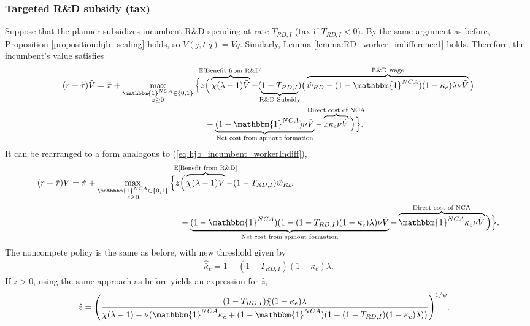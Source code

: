 \documentclass[11pt,english]{article}
\theoremstyle{definition}
\begin{document}
\subsubsection{Targeted R\&D subsidy (tax)}\label{appendix:model:efficiencyderivations:OIRDtax}

Suppose that the planner subsidizes incumbent R\&D spending at rate $T_{RD,I}$ (tax if $T_{RD,I} < 0$). By the same argument as before, Proposition \ref{proposition:hjb_scaling} holds, so $V(j,t|q) = \tilde{V}q$. Similarly, Lemma \ref{lemma:RD_worker_indifference1} holds. Therefore, the incumbent's value satisfies
\begin{align}
	(r + \hat{\tau}) \tilde{V} = \tilde{\pi} + \max_{\substack{\mathbbm{1}^{NCA} \in \{0,1\} \\ z \ge 0}} \Big\{z &\Big( \overbrace{\chi (\lambda - 1) \tilde{V}}^{\mathclap{\mathbb{E}[\textrm{Benefit from R\&D}]}}- (\underbrace{1-T_{RD,I}}_{\mathclap{\text{R\&D Subsidy}}}) \big( \overbrace{\hat{w}_{RD} - (1-\mathbbm{1}^{NCA})(1-\kappa_e)\lambda \nu \tilde{V}}^{\mathclap{\text{R\&D wage}}}\big) \label{eq:hjb_incumbent_RDsubsidyTargeted} \nonumber \\ 
	&-  \underbrace{(1-\mathbbm{1}^{NCA}) \nu \tilde{V}}_{\mathclap{\text{Net cost from spinout formation}}} - \overbrace{x \kappa_{c} \nu \tilde{V}}^{\mathclap{\text{Direct cost of NCA}}}\Big) \Big\}.
\end{align}
It can be rearranged to a form analogous to (\ref{eq:hjb_incumbent_workerIndiff}),
\begin{align}
	(r + \hat{\tau}) \tilde{V} = \tilde{\pi} + \max_{\substack{\mathbbm{1}^{NCA} \in \{0,1\} \\ z \ge 0}} \Big\{z &\Big( \overbrace{\chi (\lambda - 1) \tilde{V}}^{\mathclap{\mathbb{E}[\textrm{Benefit from R\&D}]}}- (1-T_{RD,I}) \hat{w}_{RD} \\
	&-  \underbrace{(1-\mathbbm{1}^{NCA})(1 - (1-T_{RD,I})(1-\kappa_{e})\lambda)\nu \tilde{V}}_{\mathclap{\text{Net cost from spinout formation}}} - \overbrace{\mathbbm{1}^{NCA} \kappa_{c} \nu \tilde{V}}^{\mathclap{\text{Direct cost of NCA}}}\Big) \Big\}. \label{eq:hjb_incumbent_RDsubsidyTargeted_2}
\end{align}
The noncompete policy is the same as before, with new threshold given by 
\begin{align}
	\hat{\bar{\kappa}}_c = 1 - (1-T_{RD,I})(1-\kappa_e)\lambda.
\end{align} 
If $z > 0$, using the same approach as before yields an expression for $\hat{z}$, 
\begin{align}
	\hat{z} &= \Bigg( \frac{(1-T_{RD,I})\hat{\chi} (1-\kappa_{e}) \lambda}{\chi(\lambda -1) - \nu (\mathbbm{1}^{NCA} \kappa_c + (1-\mathbbm{1}^{NCA})(1 - (1-T_{RD,I})(1-\kappa_e)\lambda)) } \Bigg)^{1/\psi}. \label{eq:effort_entrant_RDsubsidyTargeted}
\end{align}
\end{document}
